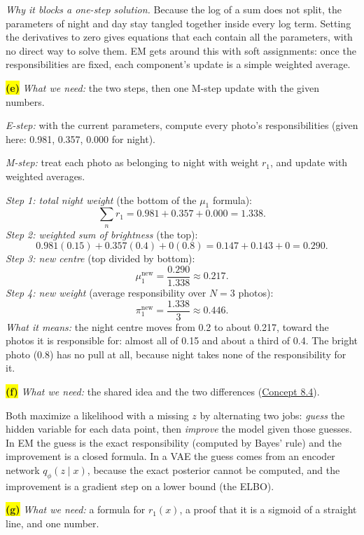 \documentclass[12pt,a4paper]{article}
\begin{document}
\emph{Why it blocks a one-step solution.} Because the log of a sum does not split, the parameters of night and day stay tangled together inside every log term. Setting the derivatives to zero gives equations that each contain all the parameters, with no direct way to solve them. EM gets around this with soft assignments: once the responsibilities are fixed, each component's update is a simple weighted average.

\colorbox{yellow}{\textbf{(e)}} \emph{What we need:} the two steps, then one M-step update with the given numbers.

\emph{E-step:} with the current parameters, compute every photo's responsibilities (given here: 0.981, 0.357, 0.000 for night).

\emph{M-step:} treat each photo as belonging to night with weight $r_1$, and update with weighted averages.

\emph{Step 1: total night weight} (the bottom of the $\mu_1$ formula):
\[
\sum_n r_1=0.981+0.357+0.000=1.338 .
\]
\emph{Step 2: weighted sum of brightness} (the top):
\[
0.981(0.15)+0.357(0.4)+0(0.8)=0.147+0.143+0=0.290 .
\]
\emph{Step 3: new centre} (top divided by bottom):
\[
\mu_1^{\text{new}}=\frac{0.290}{1.338}\approx0.217 .
\]
\emph{Step 4: new weight} (average responsibility over $N=3$ photos):
\[
\pi_1^{\text{new}}=\frac{1.338}{3}\approx0.446 .
\]
\emph{What it means:} the night centre moves from 0.2 to about 0.217, toward the photos it is responsible for: almost all of 0.15 and about a third of 0.4. The bright photo (0.8) has no pull at all, because night takes none of the responsibility for it.

\colorbox{yellow}{\textbf{(f)}} \emph{What we need:} the shared idea and the two differences (\hyperref[c8-4]{Concept 8.4}).

Both maximize a likelihood with a missing $z$ by alternating two jobs: \emph{guess} the hidden variable for each data point, then \emph{improve} the model given those guesses. In EM the guess is the exact responsibility (computed by Bayes' rule) and the improvement is a closed formula. In a VAE the guess comes from an encoder network $q_\phi(z\mid x)$, because the exact posterior cannot be computed, and the improvement is a gradient step on a lower bound (the ELBO).

\colorbox{yellow}{\textbf{(g)}} \emph{What we need:} a formula for $r_1(x)$, a proof that it is a sigmoid of a straight line, and one number.
\end{document}
